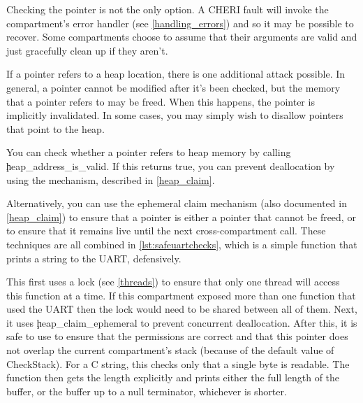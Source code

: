\begin{note}
Checking the pointer is not the only option.
A CHERI fault will invoke the compartment's error handler (see \ref{handling_errors}) and so it may be possible to recover.
Some compartments choose to assume that their arguments are valid and just gracefully clean up if they aren't.
\end{note}

If a pointer refers to a heap location, there is one additional attack possible.
In general, a pointer cannot be modified after it's been checked, but the memory that a pointer refers to may be freed.
When this happens, the pointer is implicitly invalidated.
In some cases, you may simply wish to disallow pointers that point to the heap.

You can check whether a pointer refers to heap memory by calling \c{heap_address_is_valid}.
If this returns true, you can prevent deallocation by using the  mechanism, described in \ref{heap_claim}.


Alternatively, you can use the ephemeral claim mechanism (also documented in \ref{heap_claim}) to ensure that a pointer is either a pointer that cannot be freed, or to ensure that it remains live until the next cross-compartment call.
These techniques are all combined in \ref{lst:safeuartchecks}, which is a simple function that prints a string to the UART, defensively.

\codelisting[marker=safe_uart,caption=Checks to ensure that a function does not crash.,label=lst:safeuartchecks, filename=examples/check_arguments/uart.cc]{}

This first uses a lock (see \ref{threads}) to ensure that only one thread will access this function at a time.
If this compartment exposed more than one function that used the UART then the lock would need to be shared between all of them.
Next, it uses \c{heap_claim_ephemeral} to prevent concurrent deallocation.
After this, it is safe to use  to ensure that the permissions are correct and that this pointer does not overlap the current compartment's stack (because of the default value of CheckStack).
For a C string, this checks only that a single byte is readable.
The function then gets the length explicitly and prints either the full length of the buffer, or the buffer up to a null terminator, whichever is shorter.


